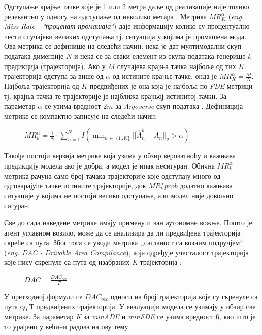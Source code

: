 \documentclass[11pt,oneside]{memoir}
\begin{document}
Одступање крајње тачке које је 1 или 2 метра даље од реализације није толико релевантно у односу на одступање од 
неколико метара \cite{home}. Метрика $MR^{\alpha}_{K}$ (\textit{eng. Miss Rate - "проценат промашаја"}) даје информацију
колико су процентуално чести случајеви великих одступања тј. ситуација у којима је промашена мода. Ова метрика се дефинише на следећи начин: 
нека је дат мултимодални скуп података димензије $N$ и нека се за сваки елемент из скупа података генерише $k$ предикција (трајекторија). Ако
у $M$ случајева крајња тачка најбоље од тих $K$ трајекторија одступа за више од $\alpha$ од истините крајње тачке, 
онда је $MR^{\alpha}_{K} = \frac{M}{N}$. Најбоља трајекторија од $K$ предвиђених је она која је најбоља по \textit{FDE} метрици тј.
крајња тачка те трајекторије је најближа крајњој истинитој тачки. За параметар $\alpha$ се узима вредност $2m$ за \textit{Argoverse} 
скуп података \cite{argoverse}. Дефиниција метрике се компактно записује на следећи начин:

\begin{figure}[H]
  \centering
  $MR^{\alpha}_{k} = \frac{1}{N}\cdot \sum^N_{n=1} I(\displaystyle\min_{k\ \in\ \{1..K\}}||\hat{A}^{k}_{n} - A_{n}||_{2} > \alpha)$
\end{figure}

Такође постоји верзија метрике која узима у обзир вероватноћу и кажњава предикцију модела ако је добра, а модел је ипак несигуран. \cite{argoverse}
Обична $MR^{\alpha}_{k}$ метрика рачуна само број тачака трајекторије које одступају много од одговарајуће тачке истините трајекторије, док
$MR^{\alpha}_{k}{prob}$ додатно кажњава ситуације у којима не постоји велико одступање, али модел није довољно сигуран. 

Све до сада наведене метрике имају примену и ван аутономне вожње. Пошто је агент углавном возило, може да
се анализира да ли предвиђена трајекторија скреће са пута. Због тога се уводи метрика ,,сагланост са возним подручјем`` 
(\textit{eng. DAC - Drivable Area Compilance}), која одређује учесталост трајекторија које нису скренуле са пута од изабраних 
\textit{K} трајекторија \cite{argoverse}:

\begin{figure}[H]
  \centering
  $DAC = \frac{DAC_{occ}}{T}$
\end{figure}

У претходној формули се $DAC_{occ}$ односи на број трајекторија које су скренуле са пута од Т предвиђених трајекторија. 
У евалуацији модела се узимају у обзир све метрике. За параметар \textit{K} за \textit{minADE} и \textit{minFDE} се узима вредност 6,
као што је то урађено у већини радова на ову тему.
\end{document}
